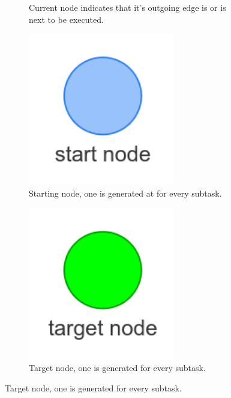 \begin{figure}[H]
\begin{subfigure}{0.2\textwidth}
    \caption{Current node indicates that it's outgoing edge is or is next to be executed.}%
    \end{subfigure}
    \begin{subfigure}{0.2\textwidth}
    \centering
    \includegraphics[width=0.7\textwidth]{figures/connecting_nodes/legend/starting_node}
    \caption{Starting node, one is generated at for every subtask.}%
    \end{subfigure}
    \begin{subfigure}{0.2\textwidth}
    \centering
    \includegraphics[width=0.7\textwidth]{figures/connecting_nodes/legend/target_node}
    \caption{Target node, one is generated for every subtask.\newline}%
    \end{subfigure}


\end{figure}
